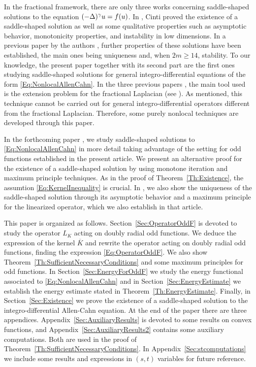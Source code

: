 In the fractional framework, there are only three works concerning saddle-shaped solutions to the equation $(-\Delta)^\gamma u = f(u)$. In  \cite{Cinti-Saddle,Cinti-Saddle2}, Cinti proved the existence of a saddle-shaped solution as well as some qualitative properties such as asymptotic behavior, monotonicity properties, and instability in low dimensions. In a previous paper by the authors \cite{Felipe-Sanz-Perela:SaddleFractional}, further properties of these solutions have been established, the main ones being uniqueness and, when $2m\geq 14$, stability. To our knowledge, the present paper together with its second part \cite{FelipeSanz-Perela:IntegroDifferentialII} are the first ones studying saddle-shaped solutions for general integro-differential equations of the form \eqref{Eq:NonlocalAllenCahn}. In the three previous papers \cite{Cinti-Saddle, Cinti-Saddle2, Felipe-Sanz-Perela:SaddleFractional}, the main tool used is the extension problem for the fractional Laplacian (see \cite{CaffarelliSilvestre}). As mentioned, this technique cannot be carried out for general integro-differential operators different from the fractional Laplacian. Therefore, some purely nonlocal techniques are developed through this paper.

In the forthcoming paper \cite{FelipeSanz-Perela:IntegroDifferentialII}, we study saddle-shaped solutions to \eqref{Eq:NonlocalAllenCahn} in more detail taking advantage of the setting for odd functions established in the present article. We present an alternative proof for the existence of a saddle-shaped solution by using monotone iteration and maximum principle techniques. As in the proof of Theorem~\ref{Th:Existence}, the assumtion \eqref{Eq:KernelInequality} is crucial. In \cite{FelipeSanz-Perela:IntegroDifferentialII}, we also show the uniqueness of the saddle-shaped solution through its asymptotic behavior and a maximum principle for the linearized operator, which we also establish in that article.

This paper is organized as follows. Section~\ref{Sec:OperatorOddF} is devoted to study the operator $L_K$ acting on doubly radial odd functions. We deduce the expression of the kernel $\overline{K}$ and rewrite the operator acting on doubly radial odd functions, finding the expression \eqref{Eq:OperatorOddF}. We also show Theorem~\ref{Th:SufficientNecessaryConditions} and some maximum principles for odd functions. In Section~\ref{Sec:EnergyForOddF} we study the energy functional associated to \eqref{Eq:NonlocalAllenCahn} and in Section~\ref{Sec:EnergyEstimate} we establish the energy estimate stated in Theorem~\ref{Th:EnergyEstimate}. Finally, in Section~\ref{Sec:Existence} we prove the existence of a saddle-shaped solution to the integro-differential Allen-Cahn equation. At the end of the paper there are three appendices. Appendix~\ref{Sec:AuxiliaryResults} is devoted to some results on convex functions, and Appendix~\ref{Sec:AuxiliaryResults2} contains some auxiliary computations. Both are used in the proof of Theorem~\ref{Th:SufficientNecessaryConditions}. In Appendix~\ref{Sec:stcomputations} we include some results and expressions in $(s,t)$ variables for future reference.